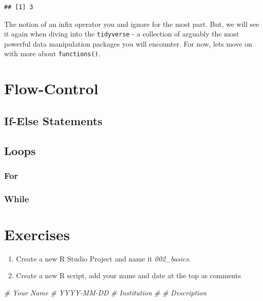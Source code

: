 \documentclass[
]{book}
\newenvironment{Shaded}{\begin{snugshade}}{\end{snugshade}}
\newcommand{\CommentTok}[1]{\textcolor[rgb]{0.56,0.35,0.01}{\textit{#1}}}
\providecommand{\tightlist}{%
  \setlength{\itemsep}{0pt}\setlength{\parskip}{0pt}}
\begin{document}
\begin{verbatim}
## [1] 3
\end{verbatim}

The notion of an infix operator you and ignore for the most part. But, we will see it again when diving into the \texttt{tidyverse} - a collection of arguably the most powerful data manipulation packages you will encounter. For now, lets move on with more about \texttt{functions()}.

\hypertarget{flow-control}{%
\section{Flow-Control}\label{flow-control}}

\hypertarget{if-else-statements}{%
\subsection{If-Else Statements}\label{if-else-statements}}

\hypertarget{loops}{%
\subsection{Loops}\label{loops}}

\hypertarget{for}{%
\subsubsection{For}\label{for}}

\hypertarget{while}{%
\subsubsection{While}\label{while}}

\hypertarget{exercises-1}{%
\section*{Exercises}\label{exercises-1}}

\begin{enumerate}
\def\labelenumi{\arabic{enumi}.}
\tightlist
\item
  Create a new R Studio Project and name it \emph{002\_basics}.
\item
  Create a new R script, add your name and date at the top as comments
\end{enumerate}

\begin{Shaded}
\begin{Highlighting}[]
\CommentTok{\# Your Name}
\CommentTok{\# YYYY{-}MM{-}DD}
\CommentTok{\# Institution}
\CommentTok{\#}
\CommentTok{\# Description}
\end{Highlighting}
\end{Shaded}
\end{document}
